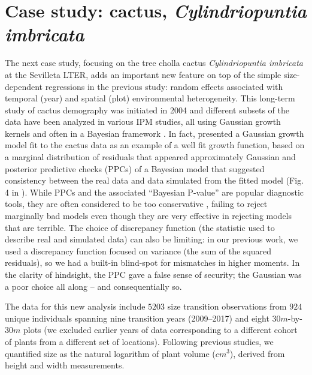 \documentclass[11pt]{article}
\begin{document}
{\clearpage   

\section{Case study: cactus, \emph{Cylindriopuntia imbricata}}
The next case study, focusing on the tree cholla cactus \emph{Cylindriopuntia imbricata} at the Sevilleta LTER, adds an important new
feature on top of the simple size-dependent regressions in the previous study: random effects associated with temporal (year) and spatial (plot) environmental heterogeneity. 
This long-term study of cactus demography was initiated in 2004 and different subsets of the data have been analyzed in various IPM studies, all using Gaussian growth kernels and often in a Bayesian framework \citep{miller2009impacts,czachurademographic,compagnoni2016effect,ohm2014balancing,elderd2016quantifying}.
In fact, \citep{elderd2016quantifying} presented a Gaussian growth model fit to the cactus data as an example of a well fit growth function, based on a marginal distribution of residuals that appeared approximately Gaussian and posterior predictive checks (PPCs) of a Bayesian model that suggested consistency between the real data and data simulated from the fitted model (Fig. 4 in \citep{elderd2016quantifying}). 
While PPCs and the associated ``Bayesian P-value'' are popular diagnostic tools, they are often considered to be too conservative \citep{conn2018guide,zhang2014comparative}, failing to reject marginally bad models even though they are very effective in rejecting models that are terrible.
The choice of discrepancy function (the statistic used to describe real and simulated data) can also be limiting: in our previous work, we used a discrepancy function focused on variance (the sum of the squared residuals), so we had a built-in blind-spot for mismatches in higher moments.
In the clarity of hindsight, the PPC gave a false sense of security; the Gaussian was a poor choice all along -- and consequentially so.

The data for this new analysis include $5203$ size transition observations from $924$ unique individuals spanning nine transition years (2009--2017) and eight $30m$-by-$30m$ plots (we excluded earlier years of data corresponding to a different cohort of plants from a different set of locations). 
Following previous studies, we quantified size as the natural logarithm of plant volume ($cm^3$), derived from height and width measurements. 

}
\end{document}
